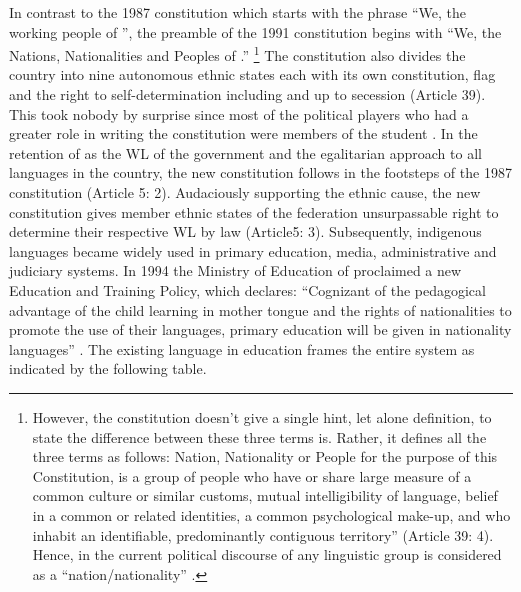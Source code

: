 \documentclass[output=paper,modfonts]{langscibook}
\begin{document}
In contrast to the 1987 constitution which starts with the phrase “We, the working people of ”, the preamble of the 1991 constitution begins with “We, the Nations, Nationalities and Peoples of .”{} \footnote{However, the constitution doesn’t give a single hint, let alone definition, to state the difference between these three terms is. Rather, it defines all the three terms as follows:  {\textquotedbl}Nation, Nationality or People for the purpose of this Constitution, is a group of people who have or share large measure of a common culture or similar customs, mutual intelligibility of language, belief in a common or related identities, a common psychological make-up, and who inhabit an identifiable, predominantly contiguous territory” (Article 39: 4). Hence, in the current political discourse of  any linguistic group is considered as a “nation/nationality” \citep{Vaughan2006}.} The constitution also divides the country into nine autonomous ethnic states each with its own constitution, flag and the right to self-determination including and up to secession (Article 39). This took nobody by surprise since most of the political players who had a greater role in writing the constitution were members of the student . In the retention of  as the WL of the government and the egalitarian approach to all languages in the country, the new constitution follows in the footsteps of the 1987 constitution (Article 5: 2). Audaciously supporting the ethnic cause, the new constitution gives member ethnic states of the federation unsurpassable right to determine their respective WL by law (Article5: 3). Subsequently, indigenous languages became widely used in primary education, media, administrative and judiciary systems. In  1994 the Ministry of Education of  proclaimed a new Education and Training Policy, which declares: “Cognizant of the pedagogical advantage of the child learning in mother tongue and the rights of nationalities to promote the use of their languages, primary education will be given in nationality languages” \citep{FDRE1994}. The existing language in education  frames the entire system as indicated by the following table.
 
\end{document}
